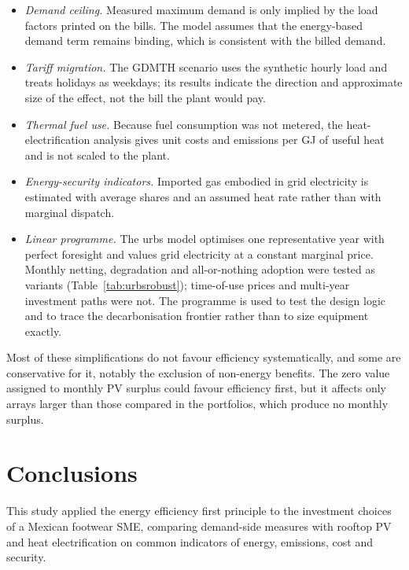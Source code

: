 \documentclass[processes,article,submit,pdftex,moreauthors]{Definitions/mdpi}
\begin{document}
\begin{itemize}
\item \emph{Demand ceiling.} Measured maximum demand is only implied by the load factors printed on the bills. The model assumes that the energy-based demand term remains binding, which is consistent with the billed demand.
\item \emph{Tariff migration.} The GDMTH scenario uses the synthetic hourly load and treats holidays as weekdays; its results indicate the direction and approximate size of the effect, not the bill the plant would pay.
\item \emph{Thermal fuel use.} Because fuel consumption was not metered, the heat-electrification analysis gives unit costs and emissions per GJ of useful heat and is not scaled to the plant.
\item \emph{Energy-security indicators.} Imported gas embodied in grid electricity is estimated with average shares and an assumed heat rate rather than with marginal dispatch.
\item \emph{Linear programme.} The urbs model optimises one representative year with perfect foresight and values grid electricity at a constant marginal price. Monthly netting, degradation and all-or-nothing adoption were tested as variants (Table~\ref{tab:urbsrobust}); time-of-use prices and multi-year investment paths were not. The programme is used to test the design logic and to trace the decarbonisation frontier rather than to size equipment exactly.
\end{itemize}
Most of these simplifications do not favour efficiency systematically, and some are conservative for it, notably the exclusion of non-energy benefits. The zero value assigned to monthly PV surplus could favour efficiency first, but it affects only arrays larger than those compared in the portfolios, which produce no monthly surplus.

\section{Conclusions}
\label{sec:conclusions}

This study applied the energy efficiency first principle to the investment choices of a Mexican footwear SME, comparing demand-side measures with rooftop PV and heat electrification on common indicators of energy, emissions, cost and security.
\end{document}
